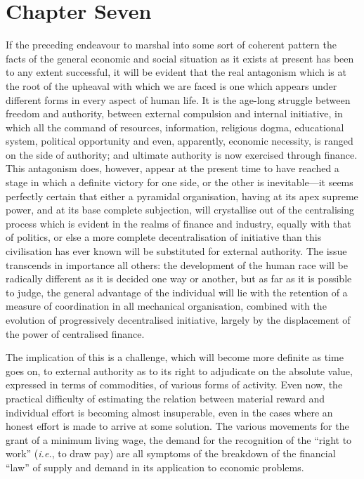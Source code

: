 \documentclass{book}
\begin{document}
\chapter{Chapter Seven}
\label{chapter-7}
If the preceding endeavour to marshal into some sort of coherent pattern the facts of the general economic and social situation as it exists at present has been to any extent successful, it will be evident that the real antagonism which is at the root of the upheaval with which we are faced is one which appears under different forms in every aspect of human life. It is the age-long struggle between freedom and authority, between external compulsion and internal initiative, in which all the command of resources, information, religious dogma, educational system, political opportunity and even, apparently, economic necessity, is ranged on the side of authority; and ultimate authority is now exercised through finance. This antagonism does, however, appear at the present time to have reached a stage in which a definite victory for one side, or the other is inevitable—it seems perfectly certain that either a pyramidal organisation, having at its apex supreme power, and at its base complete subjection, will crystallise out of the centralising process which is evident in the realms of finance and industry, equally with that of politics, or else a more complete decentralisation of initiative than this civilisation has ever known will be substituted for external authority. The issue transcends in importance all others: the development of the human race will be radically different as it is decided one way or another, but as far as it is possible to judge, the general advantage of the individual will lie with the retention of a measure of coordination in all mechanical organisation, combined with the evolution of progressively decentralised initiative, largely by the displacement of the power of centralised finance.

The implication of this is a challenge, which will become more definite as time goes on, to external authority as to its right to adjudicate on the absolute value, expressed in terms of commodities, of various forms of activity. Even now, the practical difficulty of estimating the relation between material reward and individual effort is becoming almost insuperable, even in the cases where an honest effort is made to arrive at some solution. The various movements for the grant of a minimum living wage, the demand for the recognition of the “right to work” (\emph{i.e.}, to draw pay) are all symptoms of the breakdown of the financial “law” of supply and demand in its application to economic problems.
\end{document}
